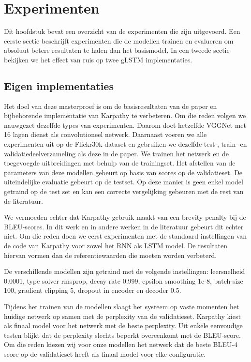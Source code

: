 \chapter{Experimenten} %
\label{cha:experimenten}
Dit hoofdstuk bevat een overzicht van de experimenten die zijn uitgevoerd. Een eerste sectie beschrijft experimenten die de modellen trainen en evalueren om absoluut betere resultaten te halen dan het basismodel. In een tweede sectie bekijken we het effect van ruis op twee gLSTM implementaties.

\section{Eigen implementaties} %
\label{sec:eigen_implementaties_exp}
Het doel van deze masterproef is om de basisresultaten van de paper en bijbehorende implementatie van Karpathy\cite{Karpathy2015} te verbeteren. Om die reden volgen we nauwgezet dezelfde types van experimenten. Daarom doet hetzelfde VGGNet met 16 lagen dienst als convolutioneel netwerk. Daarnaast voeren we alle experimenten uit op de Flickr30k dataset en gebruiken we dezelfde test-, train- en validatiedeelverzameling als deze in de paper. We trainen het netwerk en de toegevoegde uitbreidingen met behulp van de trainingset. Het afstellen van de parameters van deze modellen gebeurt op basis van scores op de validatieset. De uiteindelijke evaluatie gebeurt op de testset. Op deze manier is geen enkel model getraind op de test set en kan een correcte vergelijking gebeuren met de rest van de literatuur.

We vermoeden echter dat Karpathy gebruik maakt van een brevity penalty  bij de BLEU-scores. In dit werk en in andere werken in de literatuur gebeurt dit echter niet. Om die reden doen we eerst experimenten met de standaard instellingen van de code van Karpathy voor zowel het RNN als LSTM model. De resultaten hiervan vormen dan de referentiewaarden die moeten worden verbeterd. 

De verschillende modellen zijn getraind met de volgende instellingen: leersnelheid 0.0001, type solver rmsprop, decay rate 0.999, epsilon smoothing 1e-8, batch-size 100, gradient clipping 5, dropout in encoder en decoder 0.5. 

Tijdens het trainen van de modellen slaagt het systeem op vaste momenten het huidige netwerk op samen met de perplexity van de validatieset. Karpathy kiest als finaal model voor het netwerk met de beste perplexity. Uit enkele eenvoudige testen blijkt dat de perplexity slechts beperkt overeenkomt met de BLEU-score. Om die reden kiezen wij voor onze modellen het netwerk dat de beste BLEU-4 score op de validatieset heeft als finaal model voor elke configuratie.

